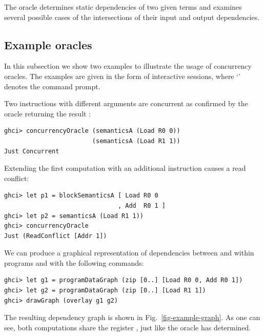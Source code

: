 The oracle determines static dependencies of two given terms and examines
several possible cases of the intersections of their input and output
dependencies.

\subsection{Example oracles}

In this subsection we show two examples to illustrate the usage of concurrency
oracles. The examples are given in the form of interactive sessions, where
`' denotes the command prompt.

Two  instructions with different arguments are concurrent as confirmed
by the oracle returning the result :

\begin{verbatim}
ghci> concurrencyOracle (semanticsA (Load R0 0))
                        (semanticsA (Load R1 1))
Just Concurrent
\end{verbatim}

\noindent
Extending the first computation with an additional  instruction causes
a read conflict:
\begin{verbatim}
ghci> let p1 = blockSemanticsA [ Load R0 0
                               , Add  R0 1 ]
ghci> let p2 = semanticsA (Load R1 1))
ghci> concurrencyOracle
Just (ReadConflict [Addr 1])
\end{verbatim}
We can produce a graphical representation of dependencies between and
within programs  and  with the following commands:

\begin{verbatim}
ghci> let g1 = programDataGraph (zip [0..] [Load R0 0, Add R0 1])
ghci> let g2 = programDataGraph (zip [0..] [Load R1 1])
ghci> drawGraph (overlay g1 g2)
\end{verbatim}

The resulting dependency graph is shown in Fig.~\ref{fig-example-graph}.
As one can see, both computations share the register , just like the
oracle has determined.

